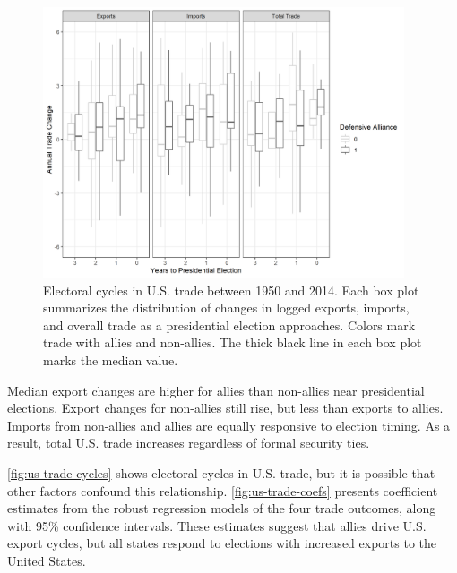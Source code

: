 \documentclass[12pt]{article}
\begin{document}
\begin{figure}
\centering
\includegraphics[width=0.95\textwidth]{../figures/us-trade-cycles-all.png}
\caption{Electoral cycles in U.S. trade between 1950 and 2014. Each box plot summarizes the distribution of changes in logged exports, imports, and overall trade as a presidential election approaches. Colors mark trade with allies and non-allies. The thick black line in each box plot marks the median value.}
\label{fig:us-trade-cycles-all}
\end{figure}


Median export changes are higher for allies than non-allies near presidential elections. 
Export changes for non-allies still rise, but less than exports to allies. 
Imports from non-allies and allies are equally responsive to election timing. 
As a result, total U.S. trade increases regardless of formal security ties.


\autoref{fig:us-trade-cycles} shows electoral cycles in U.S. trade, but it is possible that other factors confound this relationship.
\autoref{fig:us-trade-coefs} presents coefficient estimates from the robust regression models of the four trade outcomes, along with 95\% confidence intervals. 
These estimates suggest that allies drive U.S. export cycles, but all states respond to elections with increased exports to the United States. 
\end{document}
